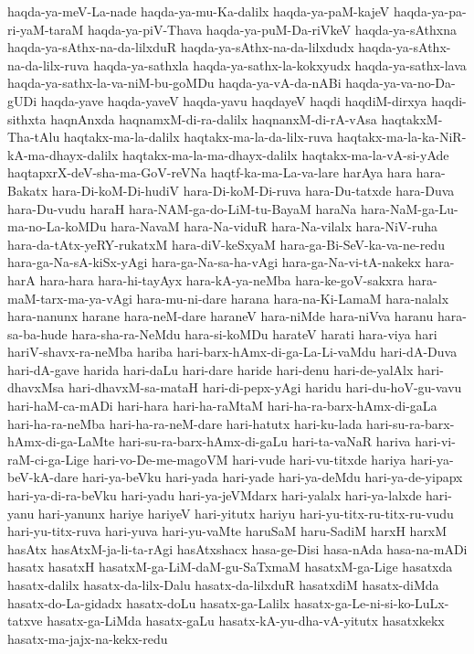 {haqda-ya-meV-La-nade
haqda-ya-mu-Ka-dalilx
haqda-ya-paM-kajeV
haqda-ya-pa-ri-yaM-taraM
haqda-ya-piV-Thava
haqda-ya-puM-Da-riVkeV
haqda-ya-sAthxna
haqda-ya-sAthx-na-da-lilxduR
haqda-ya-sAthx-na-da-lilxdudx
haqda-ya-sAthx-na-da-lilx-ruva
haqda-ya-sathxla
haqda-ya-sathx-la-kokxyudx
haqda-ya-sathx-lava
haqda-ya-sathx-la-va-niM-bu-goMDu
haqda-ya-vA-da-nABi
haqda-ya-va-no-Da-gUDi
haqda-yave
haqda-yaveV
haqda-yavu
haqdayeV
haqdi
haqdiM-dirxya
haqdi-sithxta
haqnAnxda
haqnamxM-di-ra-dalilx
haqnanxM-di-rA-vAsa
haqtakxM-Tha-tAlu
haqtakx-ma-la-dalilx
haqtakx-ma-la-da-lilx-ruva
haqtakx-ma-la-ka-NiR-kA-ma-dhayx-dalilx
haqtakx-ma-la-ma-dhayx-dalilx
haqtakx-ma-la-vA-si-yAde
haqtapxrX-deV-sha-ma-GoV-reVNa
haqtf-ka-ma-La-va-lare
harAya
hara
hara-Bakatx
hara-Di-koM-Di-hudiV
hara-Di-koM-Di-ruva
hara-Du-tatxde
hara-Duva
hara-Du-vudu
haraH
hara-NAM-ga-do-LiM-tu-BayaM
haraNa
hara-NaM-ga-Lu-ma-no-La-koMDu
hara-NavaM
hara-Na-viduR
hara-Na-vilalx
hara-NiV-ruha
hara-da-tAtx-yeRY-rukatxM
hara-diV-keSxyaM
hara-ga-Bi-SeV-ka-va-ne-redu
hara-ga-Na-sA-kiSx-yAgi
hara-ga-Na-sa-ha-vAgi
hara-ga-Na-vi-tA-nakekx
hara-harA
hara-hara
hara-hi-tayAyx
hara-kA-ya-neMba
hara-ke-goV-sakxra
hara-maM-tarx-ma-ya-vAgi
hara-mu-ni-dare
harana
hara-na-Ki-LamaM
hara-nalalx
hara-nanunx
harane
hara-neM-dare
haraneV
hara-niMde
hara-niVva
haranu
hara-sa-ba-hude
hara-sha-ra-NeMdu
hara-si-koMDu
harateV
harati
hara-viya
hari
hariV-shavx-ra-neMba
hariba
hari-barx-hAmx-di-ga-La-Li-vaMdu
hari-dA-Duva
hari-dA-gave
harida
hari-daLu
hari-dare
haride
hari-denu
hari-de-yalAlx
hari-dhavxMsa
hari-dhavxM-sa-mataH
hari-di-pepx-yAgi
haridu
hari-du-hoV-gu-vavu
hari-haM-ca-mADi
hari-hara
hari-ha-raMtaM
hari-ha-ra-barx-hAmx-di-gaLa
hari-ha-ra-neMba
hari-ha-ra-neM-dare
hari-hatutx
hari-ku-lada
hari-su-ra-barx-hAmx-di-ga-LaMte
hari-su-ra-barx-hAmx-di-gaLu
hari-ta-vaNaR
hariva
hari-vi-raM-ci-ga-Lige
hari-vo-De-me-magoVM
hari-vude
hari-vu-titxde
hariya
hari-ya-beV-kA-dare
hari-ya-beVku
hari-yada
hari-yade
hari-ya-deMdu
hari-ya-de-yipapx
hari-ya-di-ra-beVku
hari-yadu
hari-ya-jeVMdarx
hari-yalalx
hari-ya-lalxde
hari-yanu
hari-yanunx
hariye
hariyeV
hari-yitutx
hariyu
hari-yu-titx-ru-titx-ru-vudu
hari-yu-titx-ruva
hari-yuva
hari-yu-vaMte
haruSaM
haru-SadiM
harxH
harxM
hasAtx
hasAtxM-ja-li-ta-rAgi
hasAtxshacx
hasa-ge-Disi
hasa-nAda
hasa-na-mADi
hasatx
hasatxH
hasatxM-ga-LiM-daM-gu-SaTxmaM
hasatxM-ga-Lige
hasatxda
hasatx-dalilx
hasatx-da-lilx-Dalu
hasatx-da-lilxduR
hasatxdiM
hasatx-diMda
hasatx-do-La-gidadx
hasatx-doLu
hasatx-ga-Lalilx
hasatx-ga-Le-ni-si-ko-LuLx-tatxve
hasatx-ga-LiMda
hasatx-gaLu
hasatx-kA-yu-dha-vA-yitutx
hasatxkekx
hasatx-ma-jajx-na-kekx-redu
}
